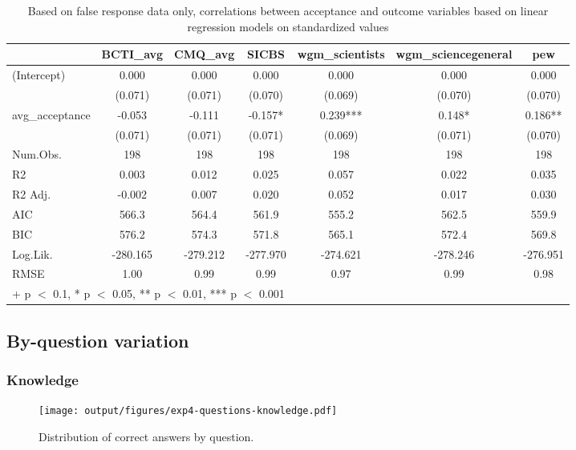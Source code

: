 \documentclass[
  doc,floatsintext]{apa6}
\begin{document}
\begin{table}

\caption{\label{tab:exp4-false-response-regression}Based on false response data only, correlations between acceptance and outcome variables based on linear regression models on standardized values}
\centering
\begin{tabular}[t]{lcccccc}
\toprule
  & BCTI\_avg & CMQ\_avg & SICBS & wgm\_scientists & wgm\_sciencegeneral & pew\\
\midrule
(Intercept) & 0.000 & 0.000 & 0.000 & 0.000 & 0.000 & 0.000\\
 & (0.071) & (0.071) & (0.070) & (0.069) & (0.070) & (0.070)\\
avg\_acceptance & -0.053 & -0.111 & -0.157* & 0.239*** & 0.148* & 0.186**\\
 & (0.071) & (0.071) & (0.071) & (0.069) & (0.071) & (0.070)\\
\midrule
Num.Obs. & 198 & 198 & 198 & 198 & 198 & 198\\
R2 & 0.003 & 0.012 & 0.025 & 0.057 & 0.022 & 0.035\\
R2 Adj. & -0.002 & 0.007 & 0.020 & 0.052 & 0.017 & 0.030\\
AIC & 566.3 & 564.4 & 561.9 & 555.2 & 562.5 & 559.9\\
BIC & 576.2 & 574.3 & 571.8 & 565.1 & 572.4 & 569.8\\
Log.Lik. & -280.165 & -279.212 & -277.970 & -274.621 & -278.246 & -276.951\\
RMSE & 1.00 & 0.99 & 0.99 & 0.97 & 0.99 & 0.98\\
\bottomrule
\multicolumn{7}{l}{\rule{0pt}{1em}+ p $<$ 0.1, * p $<$ 0.05, ** p $<$ 0.01, *** p $<$ 0.001}\\
\end{tabular}
\end{table}

\subsection{By-question variation}\label{by-question-variation-3}

\subsubsection{Knowledge}\label{knowledge-3}



\begin{figure}
\centering
\texttt{[image: output/figures/exp4-questions-knowledge.pdf]}
\caption{\label{fig:exp4-questions-knowledge}Distribution of correct answers by question.}
\end{figure}
\end{document}
